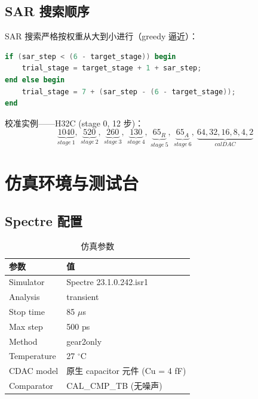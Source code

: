 \documentclass[12pt,a4paper]{article}
\begin{document}
\subsection{SAR 搜索顺序}
SAR 搜索严格按权重从大到小进行（greedy 逼近）：

\begin{lstlisting}[language=verilog,caption={正确的高位 trial 顺序生成}]
if (sar_step < (6 - target_stage)) begin
    trial_stage = target_stage + 1 + sar_step;
end else begin
    trial_stage = 7 + (sar_step - (6 - target_stage));
end
\end{lstlisting}

校准实例——H32C (stage 0, 12 步)：
\begin{equation}
\underbrace{1040}_{stage\ 1},\ 
\underbrace{520}_{stage\ 2},\ 
\underbrace{260}_{stage\ 3},\ 
\underbrace{130}_{stage\ 4},\ 
\underbrace{65_R}_{stage\ 5},\ 
\underbrace{65_A}_{stage\ 6},\ 
\underbrace{64,32,16,8,4,2}_{calDAC}
\end{equation}

\section{仿真环境与测试台}

\subsection{Spectre 配置}
\begin{table}[H]
\centering
\caption{仿真参数}
\begin{tabular}{ll}
\toprule
参数 & 值 \\
\midrule
Simulator & Spectre 23.1.0.242.isr1 \\
Analysis & transient \\
Stop time & 85 $\mu$s \\
Max step & 500 ps \\
Method & gear2only \\
Temperature & 27 $^\circ$C \\
CDAC model & 原生 capacitor 元件 (Cu = 4 fF) \\
Comparator & CAL\_CMP\_TB (无噪声) \\
\bottomrule
\end{tabular}
\end{table}
\end{document}

